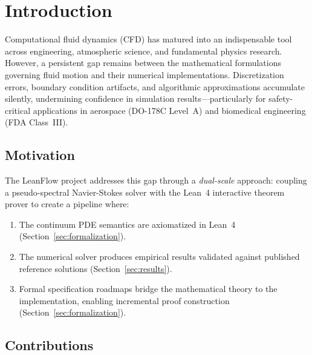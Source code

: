 
\section{Introduction}
\label{sec:introduction}

Computational fluid dynamics (CFD) has matured into an indispensable tool 
across engineering, atmospheric science, and fundamental physics research. 
However, a persistent gap remains between the mathematical formulations 
governing fluid motion and their numerical implementations. Discretization 
errors, boundary condition artifacts, and algorithmic approximations accumulate 
silently, undermining confidence in simulation results—particularly for 
safety-critical applications in aerospace (DO-178C Level~A) and biomedical 
engineering (FDA Class~III).

\subsection{Motivation}

The LeanFlow project addresses this gap through a \emph{dual-scale} 
approach: coupling a pseudo-spectral Navier-Stokes solver with the Lean~4 
interactive theorem prover to create a pipeline where:
\begin{enumerate}
  \item The continuum PDE semantics are axiomatized in Lean~4 (Section~\ref{sec:formalization}).
  \item The numerical solver produces empirical results validated against 
        published reference solutions (Section~\ref{sec:results}).
  \item Formal specification roadmaps bridge the mathematical theory to the 
        implementation, enabling incremental proof construction (Section~\ref{sec:formalization}).
\end{enumerate}

\subsection{Contributions}

